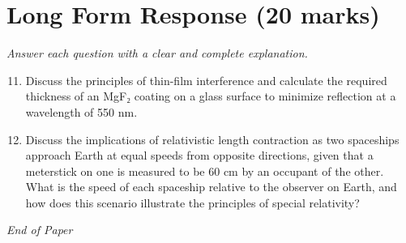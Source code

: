 \documentclass[12pt]{article}
\begin{document}
\section*{Long Form Response (20 marks)}
\textit{Answer each question with a clear and complete explanation.}
\begin{enumerate}[label=\arabic*.]
\setcounter{enumi}{10}
\item Discuss the principles of thin-film interference and calculate the required thickness of
an MgF₂ coating on a glass surface to minimize reflection at a wavelength of 550 nm.
\item Discuss the implications of relativistic length contraction as two spaceships approach
Earth at equal speeds from opposite directions, given that a meterstick on one is measured
to be 60 cm by an occupant of the other. What is the speed of each spaceship relative to
the observer on Earth, and how does this scenario illustrate the principles of special
relativity?
\end{enumerate}

\vfill
\noindent\textit{End of Paper}
\end{document}
